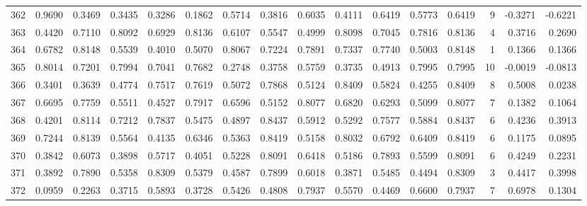 \begin{tabular}{lrrrrrrrrrrrrrrr}
362 &      0.9690 &  0.3469 &  0.3435 &  0.3286 &  0.1862 &  0.5714 &  0.3816 &  0.6035 &  0.4111 &  0.6419 &   0.5773 &     0.6419 &      9 &                   -0.3271 &                    -0.6221 \\
363 &      0.4420 &  0.7110 &  0.8092 &  0.6929 &  0.8136 &  0.6107 &  0.5547 &  0.4999 &  0.8098 &  0.7045 &   0.7816 &     0.8136 &      4 &                    0.3716 &                     0.2690 \\
364 &      0.6782 &  0.8148 &  0.5539 &  0.4010 &  0.5070 &  0.8067 &  0.7224 &  0.7891 &  0.7337 &  0.7740 &   0.5003 &     0.8148 &      1 &                    0.1366 &                     0.1366 \\
365 &      0.8014 &  0.7201 &  0.7994 &  0.7041 &  0.7682 &  0.2748 &  0.3758 &  0.5759 &  0.3735 &  0.4913 &   0.7995 &     0.7995 &     10 &                   -0.0019 &                    -0.0813 \\
366 &      0.3401 &  0.3639 &  0.4774 &  0.7517 &  0.7619 &  0.5072 &  0.7868 &  0.5124 &  0.8409 &  0.5824 &   0.4255 &     0.8409 &      8 &                    0.5008 &                     0.0238 \\
367 &      0.6695 &  0.7759 &  0.5511 &  0.4527 &  0.7917 &  0.6596 &  0.5152 &  0.8077 &  0.6820 &  0.6293 &   0.5099 &     0.8077 &      7 &                    0.1382 &                     0.1064 \\
368 &      0.4201 &  0.8114 &  0.7212 &  0.7837 &  0.5475 &  0.4897 &  0.8437 &  0.5912 &  0.5292 &  0.7577 &   0.5884 &     0.8437 &      6 &                    0.4236 &                     0.3913 \\
369 &      0.7244 &  0.8139 &  0.5564 &  0.4135 &  0.6346 &  0.5363 &  0.8419 &  0.5158 &  0.8032 &  0.6792 &   0.6409 &     0.8419 &      6 &                    0.1175 &                     0.0895 \\
370 &      0.3842 &  0.6073 &  0.3898 &  0.5717 &  0.4051 &  0.5228 &  0.8091 &  0.6418 &  0.5186 &  0.7893 &   0.5599 &     0.8091 &      6 &                    0.4249 &                     0.2231 \\
371 &      0.3892 &  0.7890 &  0.5358 &  0.8309 &  0.5379 &  0.4587 &  0.7899 &  0.6018 &  0.3871 &  0.5485 &   0.4494 &     0.8309 &      3 &                    0.4417 &                     0.3998 \\
372 &      0.0959 &  0.2263 &  0.3715 &  0.5893 &  0.3728 &  0.5426 &  0.4808 &  0.7937 &  0.5570 &  0.4469 &   0.6600 &     0.7937 &      7 &                    0.6978 &                     0.1304 \\

\end{tabular}

